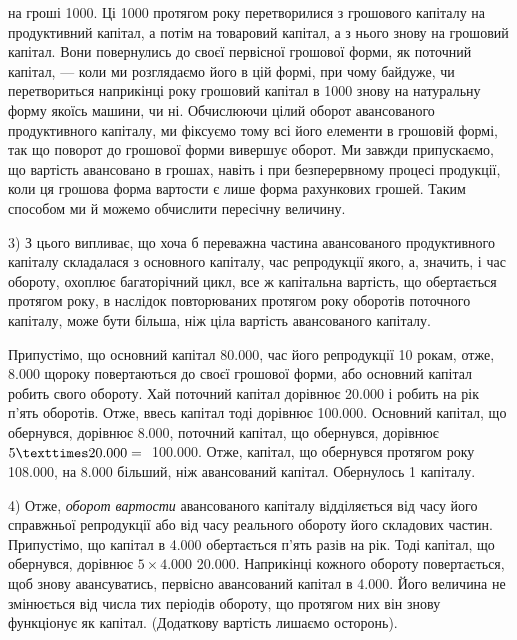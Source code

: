 \parcont{}  %
на гроші  \deq{} 1000. Ці 1000 протягом року
перетворилися з грошового капіталу на продуктивний капітал, а потім на
товаровий капітал, а з нього знову на грошовий капітал. Вони повернулись
до своєї первісної грошової форми, як поточний капітал, — коли ми
розглядаємо його в цій формі, при чому байдуже, чи перетвориться наприкінці
року грошовий капітал в 1000 знову на натуральну
форму якоїсь машини, чи ні. Обчислюючи цілий оборот авансованого продуктивного
капіталу, ми фіксуємо тому всі його елементи в грошовій формі,
так що поворот до грошової форми вивершує оборот. Ми завжди припускаємо,
що вартість авансовано в грошах, навіть і при безперервному
процесі продукції, коли ця грошова форма вартости є лише форма
рахункових грошей. Таким способом ми й можемо обчислити пересічну
величину.

3) З цього випливає, що хоча б переважна частина авансованого
продуктивного капіталу складалася з основного капіталу, час репродукції
якого, а, значить, і час обороту, охоплює багаторічний цикл, все ж капітальна
вартість, що обертається протягом року, в наслідок повторюваних
протягом року оборотів поточного капіталу, може бути більша, ніж ціла
вартість авансованого капіталу.

Припустімо, що основний капітал \deq{} \num{80.000}, час його репродукції
\deq{} 10 рокам, отже, \num{8.000} щороку повертаються до своєї
грошової форми, або основний капітал робить  свого обороту. Хай
поточний капітал дорівнює \num{20.000} і робить на рік п’ять оборотів.
Отже, ввесь капітал тоді дорівнює \num{100.000}. Основний
капітал, що обернувся, дорівнює \num{8.000}, поточний капітал, що
обернувся, дорівнює $5 × \num{20.000} \deq{}$ \num{100.000}. Отже, капітал, що
обернувся протягом року \deq{} \num{108.000}, на \num{8.000} більший,
ніж авансований капітал. Обернулось 1 \dplus{}  капіталу.

4) Отже, \emph{оборот вартости} авансованого капіталу відділяється
від часу його справжньої репродукції або від часу реального обороту
його складових частин. Припустімо, що капітал в \num{4.000} обертається
п’ять разів на рік. Тоді капітал, що обернувся, дорівнює
$5 × \num{4.000}$ \deq{} \num{20.000}. Наприкінці кожного обороту повертається,
щоб знову авансуватись, первісно авансований капітал в \num{4.000}.
Його величина не змінюється від числа тих періодів обороту, що
протягом них він знову функціонує як капітал. (Додаткову вартість
лишаємо осторонь).

